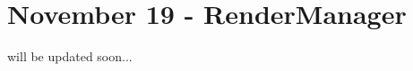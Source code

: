 \chapter{November 19 -\/ Render\+Manager}
\hypertarget{md_updates_21___november__19}{}\label{md_updates_21___november__19}
\label{md_updates_21___november__19_autotoc_md1}%
%
 will be updated soon... 